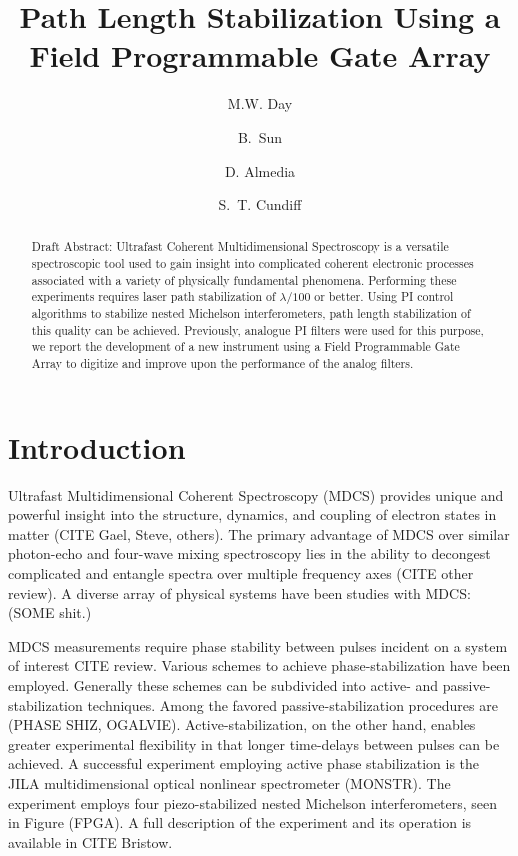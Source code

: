 \documentclass[letterpaper,12pt,amsmath,reprint,aip,jmp,twocolumn]{revtex4-1}
\begin{document}
\title{Path Length Stabilization Using a Field Programmable Gate Array}
\author{M.W. Day}
\author{B.~Sun}%
%

\author{D. Almedia}


\author{S.~T. Cundiff}

\begin{abstract}
Draft Abstract: Ultrafast Coherent Multidimensional Spectroscopy is a versatile spectroscopic tool used to gain insight into complicated coherent electronic processes associated with a variety of physically fundamental phenomena. Performing these experiments requires laser path stabilization of $\lambda / 100$ or better. Using PI control algorithms to stabilize nested Michelson interferometers, path length stabilization of this quality can be achieved. Previously, analogue PI filters were used for this purpose, we report the development of a new instrument using a Field Programmable Gate Array to digitize and improve upon the performance of the analog filters.
\end{abstract}
\maketitle

\section{Introduction}
\indent Ultrafast Multidimensional Coherent Spectroscopy (MDCS) provides unique and powerful insight into the structure, dynamics, and coupling of electron states in matter (CITE Gael, Steve, others). The primary advantage of MDCS over similar photon-echo and four-wave mixing spectroscopy lies in the ability to decongest complicated and entangle spectra over multiple frequency axes (CITE other review).  A diverse array of physical systems have been studies with MDCS: (SOME shit.) 

\indent MDCS measurements require phase stability between pulses incident on a system of interest CITE review. Various schemes to achieve phase-stabilization have been employed. Generally these schemes can be subdivided into active- and passive-stabilization techniques. Among the favored passive-stabilization procedures are (PHASE SHIZ, OGALVIE). Active-stabilization, on the other hand, enables greater experimental flexibility in that longer time-delays between pulses can be achieved. A successful experiment employing active phase stabilization is the JILA multidimensional optical nonlinear spectrometer (MONSTR). The experiment employs four piezo-stabilized nested Michelson interferometers, seen in Figure (FPGA). A full description of the experiment and its operation is available in CITE Bristow.
  
\end{document}
